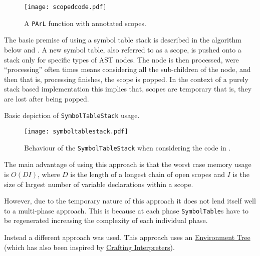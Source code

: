 \begin{figure}[H]
\centering
\begin{mdframed}[backgroundcolor=OffWhite]
\texttt{[image: scopedcode.pdf]}
\end{mdframed}
\caption{A \texttt{PArL} function with annotated scopes.}
\label{fig:scopeannotatedcode}
\end{figure}

The basic premise of using a symbol table stack is described in
the algorithm below and .
A new symbol table, also referred to as a scope, is pushed onto
a stack only for specific types of AST nodes. The node is then
processed, were ``processing'' often times means considering all
the sub-children of the node, and then that is, processing
finishes, the scope is popped. In the context of a purely stack
based implementation this implies that, scopes are temporary
that is, they are lost after being popped.

\begin{algorithm}[H]

\caption*{Basic depiction of \texttt{SymbolTableStack} usage.}
\end{algorithm}

\begin{figure}[H]
\centering
\begin{mdframed}[backgroundcolor=OffWhite]
\texttt{[image: symboltablestack.pdf]}
\end{mdframed}
\caption{Behaviour of the \texttt{SymbolTableStack} when
considering the code in .}
\label{fig:graphicaldecpiction}
\end{figure}

\label{sss:memoryadvantage}The main advantage of using this
approach is that the worst case memory usage is $O(DI)$, where
$D$ is the length of a longest chain of open scopes and $I$ is
the size of largest number of variable declarations within a
scope.

However, due to the temporary nature of this approach it does
not lend itself well to a multi-phase approach. This is because
at each phase \texttt{SymbolTable}s have to be regenerated
increasing the complexity of each individual phase.

Instead a different approach was used. This approach uses an
\href{https://craftinginterpreters.com/statements-and-state.html#nesting-and-shadowing}{Environment
Tree} (which has also been inspired by
\href{https://craftinginterpreters.com/}{Crafting
Interpreters}).

